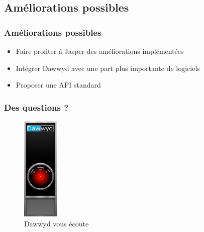 \documentclass{beamer}
\begin{document}
\subsection{Améliorations possibles}

\begin{frame}
\frametitle{Améliorations possibles}
\begin{itemize}
    \setlength\itemsep{2em}
    \item Faire profiter à Jasper des améliorations implémentées
    \item Intégrer Dawwyd avec une part plus importante de logiciels
    \item Proposer une API standard
\end{itemize}
\end{frame}

\begin{frame}
\frametitle{Des questions ?}
\centering
\begin{figure}
    \includegraphics[height=5cm]{hal_dawwyd}
    \caption{Dawwyd vous écoute}
\end{figure}
\end{frame}
\end{document}
